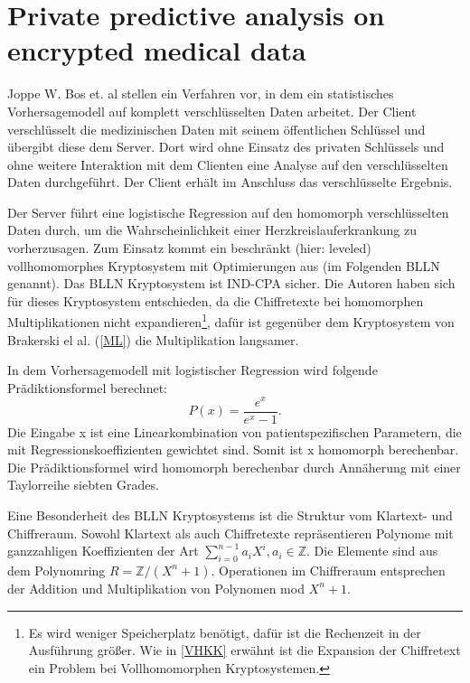\section{Private predictive analysis on encrypted medical data \cite{bos2014private}}
\label{PAMD}

Joppe W. Bos et. al stellen ein Verfahren vor, in dem ein statistisches Vorhersagemodell auf komplett verschlüsselten Daten arbeitet. Der Client verschlüsselt die medizinischen Daten mit seinem öffentlichen Schlüssel und übergibt diese dem Server. Dort wird ohne Einsatz des privaten Schlüssels und ohne weitere Interaktion mit dem Clienten eine Analyse auf den verschlüsselten Daten durchgeführt. Der Client erhält im Anschluss das verschlüsselte Ergebnis.

Der Server führt eine logistische Regression auf den homomorph verschlüsselten Daten durch, um die Wahrscheinlichkeit einer Herzkreislauferkrankung zu vorherzusagen. Zum Einsatz kommt ein beschränkt (hier: leveled) vollhomomorphes Kryptosystem \cite{bos2013improved} mit Optimierungen aus \cite{brakerski2012fully} (im Folgenden BLLN genannt). Das BLLN Kryptosystem ist IND-CPA sicher. Die Autoren haben sich für dieses Kryptosystem entschieden, da die Chiffretexte bei homomorphen Multiplikationen nicht expandieren\footnote{Es wird weniger Speicherplatz benötigt, dafür ist die Rechenzeit in der Ausführung größer. Wie in \ref{VHKK} erwähnt ist die Expansion der Chiffretext ein Problem bei Vollhomomorphen Kryptosystemen.}, dafür ist gegenüber dem Kryptosystem von Brakerski el al. (\ref{ML}) die Multiplikation langsamer.
 
In dem Vorhersagemodell mit logistischer Regression wird folgende Prädiktionsformel berechnet:
\begin{equation*}
P(x) = \frac{e^x}{e^x-1}.
\end{equation*}
Die Eingabe x ist eine Linearkombination von patientspezifischen Parametern, die mit  Regressionskoeffizienten gewichtet sind. Somit ist x homomorph berechenbar. Die Prädiktionsformel wird homomorph berechenbar durch Annäherung mit einer Taylorreihe siebten Grades.

Eine Besonderheit des BLLN Kryptosystems ist die Struktur vom Klartext- und Chiffreraum. Sowohl Klartext als auch Chiffretexte repräsentieren Polynome mit ganzzahligen Koeffizienten der Art  $\sum_{i=0}^{n-1} a_i X^i, a_i\in\mathbb{Z}$. Die Elemente sind aus dem Polynomring  $R=\mathbb{Z}/(X^n+1)$. Operationen im Chiffreraum entsprechen der Addition und Multiplikation von Polynomen mod $X^n+1$. 

